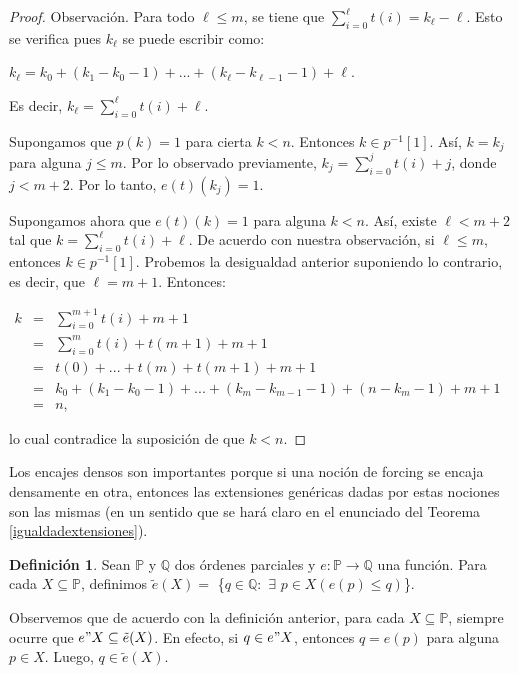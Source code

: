 \documentclass[11pt]{unam_tesis1}
\theoremstyle{MyThmStyle}
\theoremstyle{definition}
\newtheorem{definition}{Definici\'on}[chapter]
\theoremstyle{plain}
\theoremstyle{remark}
\let\leq\leqslant
\begin{document}
\begin{proof}
Observaci\'on. Para todo $\ell \leq m$, se tiene que $\sum\limits_{i=0}^{\ell}t(i)=k_{\ell}-\ell$. Esto se verifica pues $k_\ell$ se puede escribir como:

\begin{center}
$k_{\ell}=k_0+(k_1-k_0-1)+...+(k_{\ell}-k_{\ell-1}-1)+\ell$.
\end{center}

Es decir, $k_\ell=\sum\limits_{i=0}^{\ell}t(i)+\ell$.

Supongamos que $p(k)=1$ para cierta $k<n$. Entonces $k\in p^{-1}[1]$. As\'i, $k=k_j$ para alguna $j\leq m$. Por lo observado previamente, $k_j=\sum\limits_{i=0}^{j}t(i)+j$, donde $j< m+2$. Por lo tanto, $e(t)(k_j)=1$.

Supongamos ahora que $e(t)(k)=1$ para alguna $k<n$. As\'i, existe $\ell < m+2$ tal que $k=\sum\limits_{i=0}^{\ell}t(i)+\ell$. De acuerdo con nuestra observaci\'on, si $\ell \leq m$, entonces $k\in p^{-1}[1]$. Probemos la desigualdad anterior suponiendo lo contrario, es decir, que $\ell =m+1$. Entonces:

\begin{center}
$\begin{array} {lcl} k & = & \sum\limits_{i=0}^{m+1}t(i)+m+1  \\ &=& \sum\limits_{i=0}^{m}t(i)+t(m+1)+m+1 \\ & = & t(0)+...+t(m)+t(m+1)+m+1 \\ & = &  k_0+(k_1-k_0-1)+...+(k_m-k_{m-1}-1)+(n-k_m-1)+m+1 \\ & = & n,\end{array}$
\end{center}

lo cual contradice la suposici\'on de que $k<n$.
\end{proof}

Los encajes densos son importantes porque si una noci\'on de forcing se encaja densamente en otra, entonces las extensiones gen\'ericas dadas por estas nociones son las mismas (en un sentido que se har\'a claro en el enunciado del Teorema \ref{igualdadextensiones}).

\begin{definition}
Sean $\mathbb P$ y $\mathbb Q$ dos \'ordenes parciales y $e:\mathbb P\to \mathbb Q$ una funci\'on. Para cada $X\subseteq \mathbb P$, definimos $\tilde e(X)=$ \{$q\in \mathbb Q:$ $\exists$ $p\in X(e(p)\leq q)$\}.
\end{definition}

Observemos que de acuerdo con la definici\'on anterior, para cada $X\subseteq \mathbb P$, siempre ocurre que $e"X\subseteq \tilde e(X)$. En efecto, si $q\in e"X$, entonces $q=e(p)$ para alguna $p\in X$. Luego, $q\in \tilde{e}(X)$.
\end{document}
